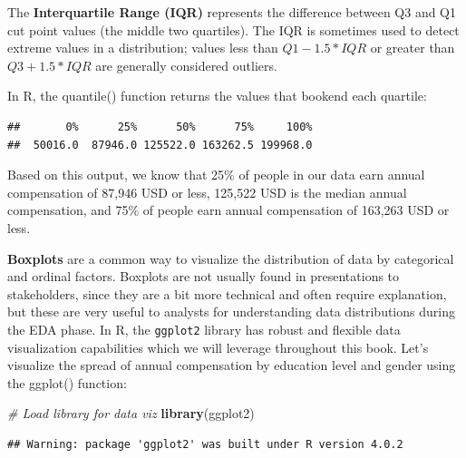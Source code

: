 \documentclass[]{book}
\newenvironment{Shaded}{\begin{snugshade}}{\end{snugshade}}
\newcommand{\CommentTok}[1]{\textcolor[rgb]{0.56,0.35,0.01}{\textit{#1}}}
\newcommand{\KeywordTok}[1]{\textcolor[rgb]{0.13,0.29,0.53}{\textbf{#1}}}
\newcommand{\NormalTok}[1]{#1}
\newcommand{\OperatorTok}[1]{\textcolor[rgb]{0.81,0.36,0.00}{\textbf{#1}}}
\begin{document}
The \textbf{Interquartile Range (IQR)} represents the difference between Q3 and Q1 cut point values (the middle two quartiles). The IQR is sometimes used to detect extreme values in a distribution; values less than \(Q1 - 1.5 * IQR\) or greater than \(Q3 + 1.5 * IQR\) are generally considered outliers.

In R, the quantile() function returns the values that bookend each quartile:

\begin{Shaded}
\end{Shaded}

\begin{verbatim}
##       0%      25%      50%      75%     100% 
##  50016.0  87946.0 125522.0 163262.5 199968.0
\end{verbatim}

Based on this output, we know that 25\% of people in our data earn annual compensation of 87,946 USD or less, 125,522 USD is the median annual compensation, and 75\% of people earn annual compensation of 163,263 USD or less.

\textbf{Boxplots} are a common way to visualize the distribution of data by categorical and ordinal factors. Boxplots are not usually found in presentations to stakeholders, since they are a bit more technical and often require explanation, but these are very useful to analysts for understanding data distributions during the EDA phase. In R, the \texttt{ggplot2} library has robust and flexible data visualization capabilities which we will leverage throughout this book. Let's visualize the spread of annual compensation by education level and gender using the ggplot() function:

\begin{Shaded}
\begin{Highlighting}[]
\CommentTok{# Load library for data viz}
\KeywordTok{library}\NormalTok{(ggplot2)}
\end{Highlighting}
\end{Shaded}

\begin{verbatim}
## Warning: package 'ggplot2' was built under R version 4.0.2
\end{verbatim}
\end{document}
